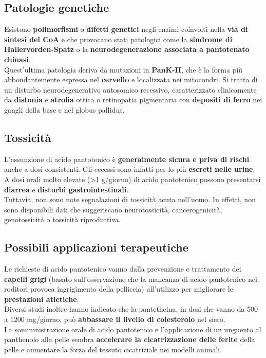 \documentclass[a4paper, 12pt]{article}
\begin{document}
\subsection{Patologie genetiche}
Esistono \textbf{polimorfismi} o \textbf{difetti genetici} negli enzimi coinvolti nella \textbf{via di sintesi del CoA} e che provocano stati patologici come la \textbf{sindrome di Hallervorden-Spatz} o la \textbf{neurodegenerazione associata a pantotenato chinasi}.\\
Quest'ultima patologia deriva da mutazioni in \textbf{PanK-II}, che è la forma più abbondantemente espressa nel \textbf{cervello} e localizzata nei mitocondri. Si tratta di un disturbo neurodegenerativo autosomico recessivo, caratterizzato clinicamente da \textbf{distonia} e \textbf{atrofia} ottica o retinopatia pigmentaria con \textbf{depositi di ferro} nei gangli della base e nel globus pallidus.

\subsection{Tossicità}
L’assunzione di acido pantotenico è \textbf{generalmente sicura e priva di rischi} anche a dosi consistenti. Gli eccessi sono infatti per lo più \textbf{escreti nelle urine}.\\
A dosi orali molto elevate (\textgreater 1 g/giorno) di acido pantotenico possono presentarsi \textbf{diarrea} e \textbf{disturbi gastrointestinali}.\\ Tuttavia, non sono note segnalazioni di tossicità acuta nell'uomo. In effetti, non sono disponibili dati che suggeriscano neurotossicità, cancerogenicità, genotossicità o tossicità riproduttiva.

\subsection{Possibili applicazioni terapeutiche}
Le richieste di acido pantotenico vanno dalla prevenzione e trattamento dei \textbf{capelli grigi} (basato sull’osservazione che la mancanza di acido pantotenico nei roditori provoca ingrigimento della pelliccia) all’utilizzo per migliorare le \textbf{prestazioni atletiche}.\\
Diversi studi inoltre hanno indicato che la pantetheina, in dosi che vanno da 500 a 1200 mg/giorno, può \textbf{abbassare il livello di colesterolo} nel siero.\\
La somministrazione orale di acido pantotenico e l’applicazione di un unguento al panthenolo alla pelle sembra \textbf{accelerare la cicatrizzazione delle ferite} della pelle e aumentare la forza del tessuto cicatriziale nei modelli animali.
\end{document}
